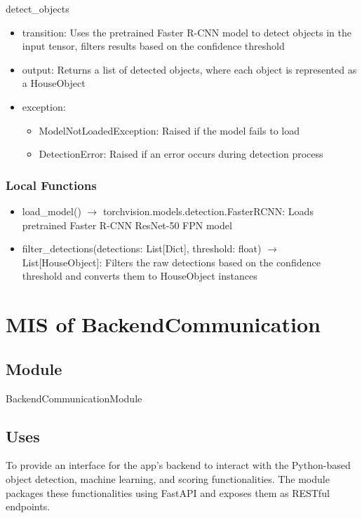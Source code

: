 \documentclass[12pt, titlepage]{article}
\begin{document}
\noindent detect{\_}objects
\begin{itemize}
\item transition: Uses the pretrained Faster R-CNN model to detect objects in the input tensor, filters results based on the confidence threshold
\item output: Returns a list of detected objects, where each object is represented as a HouseObject
\item exception: 
\begin{itemize}
  \item ModelNotLoadedException: Raised if the model fails to load
  \item DetectionError: Raised if an error occurs during detection process
\end{itemize}

\end{itemize}


\subsubsection{Local Functions}

\begin{itemize}
  \item load{\_}model() $\rightarrow$ torchvision.models.detection.FasterRCNN: Loads pretrained Faster R-CNN ResNet-50 FPN model
  \item filter{\_}detections(detections: List[Dict], threshold: float) $\rightarrow$ List[HouseObject]: Filters the raw detections based on the confidence threshold and converts them to HouseObject instances
\end{itemize}

\newpage

\section{MIS of BackendCommunication} \label{Module} 

\subsection{Module}

BackendCommunicationModule

\subsection{Uses}
To provide an interface for the app's backend to interact with the Python-based object detection, machine learning, and scoring functionalities. The module packages these functionalities using FastAPI and exposes them as RESTful endpoints.
\end{document}
